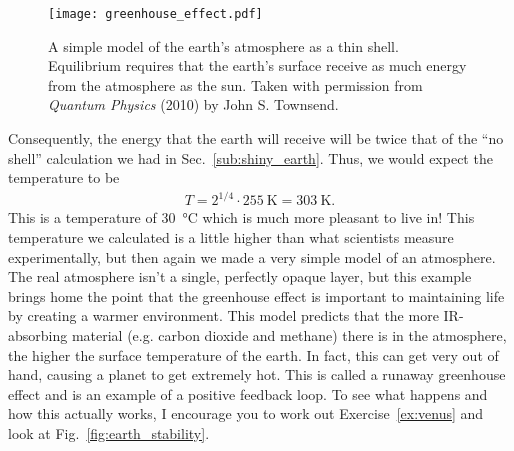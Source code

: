     \begin{figure}[ht]
        \centering 
        \texttt{[image: greenhouse\_effect.pdf]}
        \caption{A simple model of the earth's atmosphere as a thin shell. Equilibrium requires that the earth's surface receive as much energy from the atmosphere as the sun. Taken with permission from \emph{Quantum Physics} (2010) by John S. Townsend.\cite{townsend2010baby}} 
        \label{fig:greenhouse_effect}
    \end{figure}

    Consequently, the energy that the earth will receive will be twice that of the ``no shell'' calculation we had in Sec.~\ref{sub:shiny_earth}. Thus, we would expect the temperature to be 
    \begin{align}
        T = 2^{1/4} \cdot \SI{255}{\kelvin} = \SI{303}{\kelvin}.
    \end{align}
    This is a temperature of \SI{30}{\celsius} which is much more pleasant to live in! This temperature we calculated is a little higher than what scientists measure experimentally, but then again we made a very simple model of an atmosphere. The real atmosphere isn't a single, perfectly opaque layer, but this example brings home the point that the greenhouse effect is important to maintaining life by creating a warmer environment. This model predicts that the more IR-absorbing material (e.g. carbon dioxide and methane) there is in the atmosphere, the higher the surface temperature of the earth. In fact, this can get very out of hand, causing a planet to get extremely hot. This is called a runaway greenhouse effect and is an example of a positive feedback loop. To see what happens and how this actually works, I encourage you to work out Exercise~\ref{ex:venus} and look at Fig.~\ref{fig:earth_stability}.

